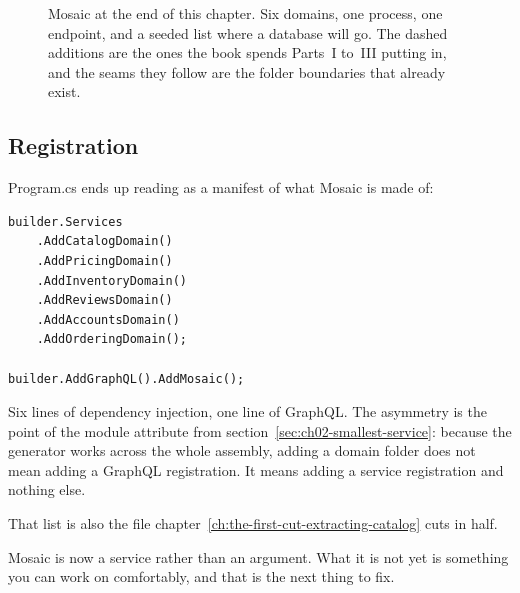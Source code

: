\begin{figure}[htbp]
  \centering
  
  \caption{Mosaic at the end of this chapter. Six domains, one process, one
  endpoint, and a seeded list where a database will go. The dashed additions are
  the ones the book spends Parts~I to~III putting in, and the seams they follow
  are the folder boundaries that already exist.}
  \label{fig:ch02-mosaic-v1}
\end{figure}

\subsection*{Registration}

Program.cs ends up reading as a manifest of what Mosaic is made of:

\begin{verbatim}
builder.Services
    .AddCatalogDomain()
    .AddPricingDomain()
    .AddInventoryDomain()
    .AddReviewsDomain()
    .AddAccountsDomain()
    .AddOrderingDomain();

builder.AddGraphQL().AddMosaic();
\end{verbatim}

Six lines of dependency injection, one line of GraphQL. The asymmetry is the
point of the module attribute from section~\ref{sec:ch02-smallest-service}:
because the generator works across the whole assembly, adding a domain folder
does not mean adding a GraphQL registration. It means adding a service
registration and nothing else.

That list is also the file
chapter~\ref{ch:the-first-cut-extracting-catalog} cuts in half.

Mosaic is now a service rather than an argument. What it is not yet is
something you can work on comfortably, and that is the next thing to fix.
